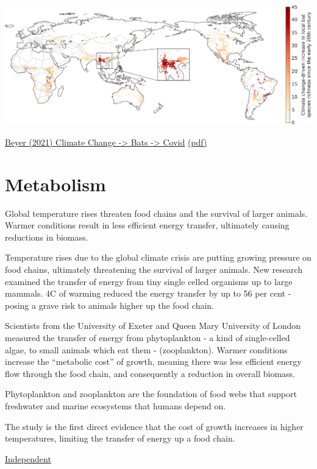 \documentclass[
]{book}
\begin{document}
\includegraphics{fig/climate_change_bats_covid.jpg}

\href{https://www.sciencedirect.com/science/article/pii/S0048969721004812}{Beyer (2021) Climate Change -\textgreater{} Bats -\textgreater{} Covid}
\href{pdf/Beyer_2010_Climate_Change_Bat_Covid.pdf}{(pdf)}

\hypertarget{metabolism}{%
\section{Metabolism}\label{metabolism}}

Global temperature rises threaten food chains and the survival of larger animals.
Warmer conditions result in less efficient energy transfer, ultimately causing reductions in biomass.

Temperature rises due to the global climate crisis are putting growing pressure on food chains,
ultimately threatening the survival of larger animals.
New research examined the transfer of energy from tiny single celled organisms up to large mammals.
4C of warming reduced the energy transfer by up to 56 per cent -
posing a grave risk to animals higher up the food chain.

Scientists from the University of Exeter and Queen Mary University of London
measured the transfer of energy from phytoplankton -
a kind of single-celled algae, to small animals which eat them - (zooplankton).
Warmer conditions increase the ``metabolic cost'' of growth,
meaning there was less efficient energy flow through the food chain,
and consequently a reduction in overall biomass.

Phytoplankton and zooplankton are the foundation of food webs that
support freshwater and marine ecosystems that humans depend on.

The study is the first direct evidence that the cost of growth increases in higher temperatures,
limiting the transfer of energy up a food chain.

\href{https://www.independent.co.uk/climate-change/news/food-chains-global-warming-animals-b1809501.html}{Independent}
\end{document}
